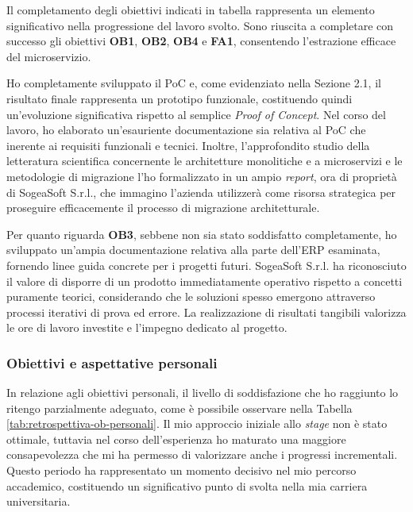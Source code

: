         \vspace{0.2 em}
        \noindent Il completamento degli obiettivi indicati in tabella rappresenta un elemento significativo nella progressione del lavoro svolto. Sono riuscita a completare con successo gli obiettivi \textbf{OB1}, \textbf{OB2}, \textbf{OB4} e \textbf{FA1}, consentendo l'estrazione efficace del microservizio.

        \vspace{0.2 em}
        \noindent Ho completamente sviluppato il PoC  e, come evidenziato nella Sezione 2.1, il risultato finale rappresenta un prototipo funzionale, costituendo quindi un'evoluzione significativa rispetto al semplice \textit{Proof of Concept}. Nel corso del lavoro, ho elaborato un'esauriente documentazione sia relativa al PoC che inerente ai requisiti funzionali e tecnici. Inoltre, l'approfondito studio della letteratura scientifica concernente le architetture monolitiche e a microservizi e le metodologie di migrazione l'ho formalizzato in un ampio \textit{report}, ora di proprietà di SogeaSoft S.r.l., che immagino l'azienda utilizzerà come risorsa strategica per proseguire efficacemente il processo di migrazione architetturale.

        \vspace{0.2 em}
        \noindent Per quanto riguarda \textbf{OB3}, sebbene non sia stato soddisfatto completamente, ho sviluppato un'ampia documentazione relativa alla parte dell'ERP esaminata, fornendo linee guida concrete per i progetti futuri. SogeaSoft S.r.l. ha riconosciuto il valore di disporre di un prodotto immediatamente operativo rispetto a concetti puramente teorici, considerando che le soluzioni spesso emergono attraverso processi iterativi di prova ed errore. La realizzazione di risultati tangibili valorizza le ore di lavoro investite e l'impegno dedicato al progetto.

        
        \subsubsection{Obiettivi e aspettative personali}

        In relazione agli obiettivi personali, il livello di soddisfazione che ho raggiunto lo ritengo parzialmente adeguato, come è possibile osservare nella Tabella \ref{tab:retrospettiva-ob-personali}. Il mio approccio iniziale allo \textit{stage} non è stato ottimale, tuttavia nel corso dell'esperienza ho maturato una maggiore consapevolezza che mi ha permesso di valorizzare anche i progressi incrementali. Questo periodo ha rappresentato un momento decisivo nel  mio percorso accademico, costituendo un significativo punto di svolta nella mia carriera universitaria.

